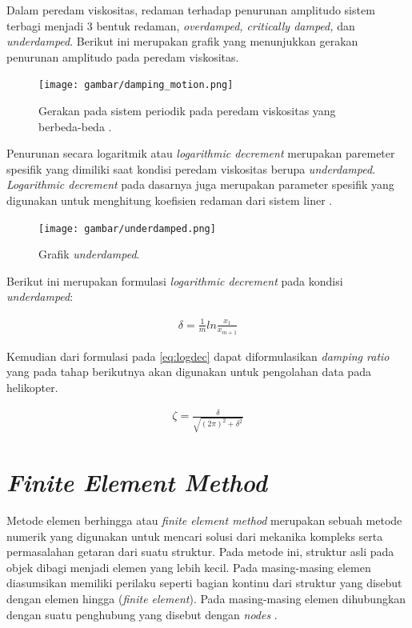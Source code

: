 Dalam peredam viskositas, redaman terhadap penurunan amplitudo sistem terbagi menjadi 3 bentuk redaman, \textit{overdamped, critically damped,} dan \textit{underdamped}. Berikut ini merupakan grafik yang menunjukkan gerakan penurunan amplitudo pada peredam viskositas. 

\begin{figure}[H]
	\centering
	\texttt{[image: gambar/damping\_motion.png]}
	\caption{Gerakan pada sistem periodik pada peredam viskositas yang berbeda-beda \cite{rao2004mechanical}.}
	\label{fig:damping_motion}
\end{figure}

Penurunan secara logaritmik atau \textit{logarithmic decrement} merupakan paremeter spesifik yang dimiliki saat kondisi peredam viskositas berupa \textit{underdamped}. \textit{Logarithmic decrement} pada dasarnya juga merupakan parameter spesifik yang digunakan untuk menghitung koefisien redaman dari sistem liner \cite{Lojewski2020InfluenceOC}. 

\begin{figure}[H]
	\centering
	\texttt{[image: gambar/underdamped.png]}
	\caption{Grafik \textit{underdamped}.}
	\label{fig:underdamped}
\end{figure}

Berikut ini merupakan formulasi \textit{logarithmic decrement} pada kondisi \textit{underdamped}:

\begin{align}
	\delta = \frac{1}{m}ln\frac{x_1}{x_{m+1}}
	\label{eq:logdec}
\end{align}

Kemudian dari formulasi pada \ref{eq:logdec} dapat diformulasikan \textit{damping ratio} yang pada tahap berikutnya akan digunakan untuk pengolahan data pada helikopter.

\begin{align}
	\zeta=\frac{\delta}{\sqrt{\left( 2\pi \right)^2+\delta^2}}
\end{align}


\section{\textit{Finite Element Method}}

Metode elemen berhingga atau \textit{finite element method} merupakan sebuah metode numerik yang digunakan untuk mencari solusi dari mekanika kompleks serta permasalahan getaran dari suatu struktur. Pada metode ini, struktur asli pada objek dibagi menjadi elemen yang lebih kecil. Pada masing-masing elemen diasumsikan memiliki perilaku seperti bagian kontinu dari struktur yang disebut dengan elemen hingga (\textit{finite element}). Pada masing-masing elemen dihubungkan dengan suatu penghubung yang disebut dengan \textit{nodes} \cite{Lojewski2020InfluenceOC}.

